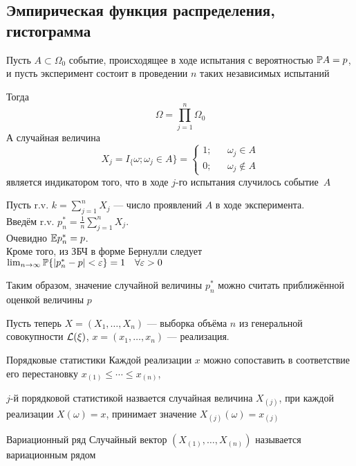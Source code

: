 \subsection{Эмпирическая функция распределения, гистограмма}

Пусть $A\subset\Omega_0$ событие,
происходящее в ходе испытания с вероятностью $\mathbb P A = p$,
и пусть эксперимент состоит в проведении $n$ таких независимых испытаний

Тогда
$$\Omega = \prod_{j=1}^n \Omega_0$$
А случайная величина
$$X_j =
I_\{\omega ; \omega_j \in A\} =
\left\{
\begin{aligned}
1; && \omega_j\in A \\
0; && \omega_j\notin A
\end{aligned}\right.$$
является индикатором того, что в ходе $j$-го испытания случилось событие~$A$

Пусть r.v. $k = \sum_{j=1}^n X_j$ --- число проявлений $A$ в ходе эксперимента. \\
Введём r.v. $p_n^* = \frac{1}{n} \sum_{j=1}^n X_j$. \\
Очевидно $\mathbb E p_n^* = p$.\\
Кроме того, из ЗБЧ в форме Бернулли следует
$\lim_{n\to\infty} \mathbb P\{ |p_n^* - p| < \varepsilon \} = 1 \quad \forall\varepsilon>0$

Таким образом, значение случайной величины $p_n^*$
можно считать приближённой оценкой величины $p$


Пусть теперь
$X = (X_1, \dotsc, X_n)$ --- выборка объёма $n$ из генеральной совокупности $\mathcal L(\xi)$,
$x = (x_1, \dotsc, x_n)$ --- реализация.

\begin{dfn}{Порядковые статистики}
Каждой реализации $x$ можно сопоставить в соответствие его перестановку
$x_{(1)} \leq \dotsb \leq x_{(n)}$,

$j$-й порядковой статистикой назвается
случайная величина $X_{(j)}$,
при каждой реализации $X(\omega)=x$,
принимает значение $X_{(j)}(\omega) = x_{(j)}$
\end{dfn}

\begin{dfn}{Вариационный ряд}
Случайный вектор $(X_{(1)}, \dotsc, X_{(n)})$ называется вариационным рядом
\end{dfn}

